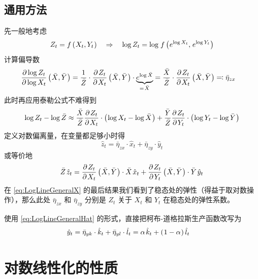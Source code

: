\subsection{通用方法}\label{subsec:LogLineGeneral}

先一般地考虑
\begin{equation}
    Z_t=f\bka{X_t,Y_t} \quad\Rightarrow\quad \log Z_t=\log \, f\bka{e^{\log X_t}, \,e^{\log Y_t}}\notag
\end{equation}
计算偏导数
\begin{align}
    \dfrac{\partial\log Z_t}{\partial\log X_t}\bka{\bar X,\bar Y}& = \dfrac1{\bar Z}\cdot\dfrac{\p Z_t}{\p X_t}\bka{\bar X,\bar Y}\cdot \underbrace{e^{\log \bar X}}_{=\,\bar X}=\dfrac{\bar X}{\bar Z}\cdot\dfrac{\p Z_t}{\p X_t}\bka{\bar X,\bar Y}\eqcolon\bar\eta_{zx}\label{eq:LogLineGeneralX}
\end{align}
此时再应用泰勒公式不难得到
\begin{align}
    \operatorname{log} Z_t-\operatorname{log}\bar Z\approx\dfrac{\bar X}{\bar Z}\dfrac{\partial\mspace{2mu} Z_t}{\partial\mspace{2mu} X_t}\cdot\left(\mspace{1mu}\operatorname{log} X_t-\operatorname{log}\bar X\mspace{1mu}\right)+\dfrac{\bar Y}{\bar Z}\dfrac{\partial\mspace{2mu} Z_t}{\partial\mspace{2mu} Y_t}\cdot\left(\mspace{1mu}\operatorname{log} Y_t-\operatorname{log}\bar Y\mspace{1mu}\right)\label{eq:LogLineGeneralTaylor}
\end{align}
定义对数偏离量，在变量都足够小时得
\begin{equation}
    \hat z_t=\bar\eta_{zx}\cdot\hat x_t+\bar\eta_{zy}\cdot\hat y_t\label{eq:LogLineGeneralHat}
\end{equation}
或等价地
\begin{equation}
    \bar Z\,\hat z_t=\dfrac{\p Z_t}{\p X_t}\bka{\bar X,\bar Y}\cdot\bar X\,\hat x_t+\dfrac{\p Z_t}{\p Y_t}\bka{\bar X,\bar Y}\cdot\bar Y\,\hat y_t\label{eq:LogLineGeneralHatLevel}
\end{equation}
在 \ref{eq:LogLineGeneralX} 的最后结果我们看到了稳态处的弹性（得益于取对数操作），那么此处 \(\bar\eta_{zx}\) 和 \(\bar\eta_{zy}\) 分别是 \(Z_t\) 关于 \(X_t\) 和 \(Y_t\) 在稳态处的弹性系数。

使用 \ref{eq:LogLineGeneralHat} 的形式，直接把柯布-道格拉斯生产函数改写为
\begin{align}
    \hat y_t&=\bar\eta_{yk}\cdot\hat k_t+\bar\eta_{yl}\cdot\hat l_t=\alpha\,\hat k_t+\bka{1-\alpha}\hat l_t\notag
\end{align}

\section{对数线性化的性质}\label{sec:LogLineProp}

